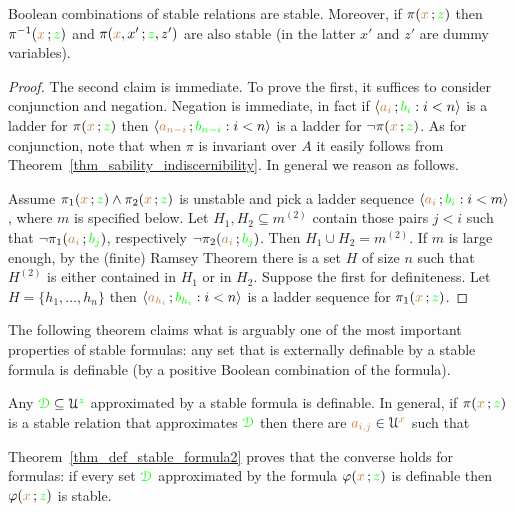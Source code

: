 \begin{lemma}\label{lem_stab_Boole}
  Boolean combinations of stable relations are stable.
  Moreover, if $\pi({\color{brown} x}\,;{\color{green} z})$ then  $\pi^{-1}({\color{brown} x}\,;{\color{green} z})$ and $\pi({\color{brown} x},x'\,;{\color{green} z},z')$ are also stable (in the latter $x'$ and $z'$ are dummy variables).
\end{lemma}

\begin{proof}
  The second claim is immediate.
  To prove the first, it suffices to consider conjunction and negation.
  Negation is immediate, in fact if $\langle{\color{brown}a_i}\,;{\color{green} b_i} : i<n\rangle$ is a ladder for $\pi({\color{brown} x}\,;{\color{green} z})$ then $\langle{\color{brown}a_{n-i}}\,;{\color{green} b_{n-i}} : i<n\rangle$ is a ladder for $\neg\pi({\color{brown} x}\,;{\color{green} z})$.
  As for conjunction, note that when $\pi$ is invariant over $A$ it easily follows from Theorem~\ref{thm_sability_indiscernibility}.
  In general we reason as follows.

  Assume $\pi_1({\color{brown} x}\,;{\color{green} z})\wedge\pi_2({\color{brown} x}\,;{\color{green} z})$ is unstable and pick a ladder sequence $\langle{\color{brown}a_i}\,;{\color{green} b_i} : i<m\rangle$, where $m$ is specified below.
  Let $H_1,H_2\subseteq m^{(2)}$ contain those pairs $j<i$ such that $\neg\pi_1({\color{brown} a_i}\,;{\color{green} b_j})$, respectively $\neg\pi_2({\color{brown} a_i}\,;{\color{green} b_j})$. 
  Then $H_1\cup H_2= m^{(2)}$. 
  If $m$ is large enough, by the (finite) Ramsey Theorem there is a set $H$ of size $n$ such that $H^{(2)}$ is either contained in $H_1$ or in $H_2$. Suppose the first for definiteness. 
  Let $H=\{h_1,\dots,h_n\}$ then $\langle{\color{brown}a_{h_i}}\,;{\color{green} b_{h_i}} : i<n\rangle$ is a ladder sequence for $\pi_1({\color{brown} x}\,;{\color{green} z})$.
\end{proof}

The following theorem claims what is arguably one of the most important properties of stable formulas: any set that is externally definable by a stable formula is definable (by a positive Boolean combination of the formula).

\begin{theorem}\label{thm_def_stable_formula}
Any ${\color{green}\EuScript D}\subseteq\EuScript U^{\color{green} z}$ approximated by a stable formula is definable.
In general, if $\pi({\color{brown} x}\,;{\color{green} z})$ is a stable relation that approximates ${\color{green}\EuScript D}$ then there are ${\color{brown} a_{i,j}}\in\EuScript U^{\color{brown} x}$ such that

\end{theorem}

Theorem~\ref{thm_def_stable_formula2} proves that the converse holds for formulas: if every set ${\color{green}\EuScript D}$ approximated by the formula $\varphi({\color{brown} x}\,;{\color{green} z})$ is definable then $\varphi({\color{brown} x}\,;{\color{green} z})$ is stable.

